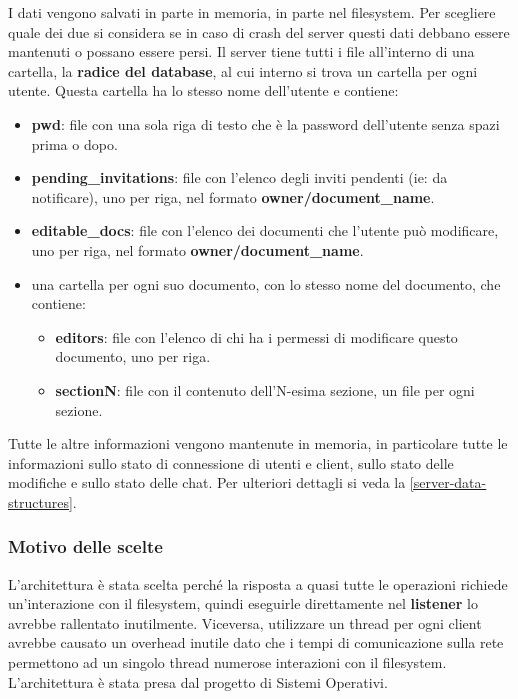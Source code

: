 \documentclass[a4paper]{article}
\theoremstyle{theorem}
\theoremstyle{remark}
\theoremstyle{definition}
\theoremstyle{corollary}
\theoremstyle{lemma}
\begin{document}
I dati vengono salvati in parte in memoria, in parte nel filesystem. Per scegliere quale dei due si considera se in caso di crash del server questi dati debbano essere mantenuti o possano essere persi. Il server tiene tutti i file all'interno di una cartella, la \textbf{radice del database}, al cui interno si trova un cartella per ogni utente. Questa cartella ha lo stesso nome dell'utente e contiene:
\begin{itemize}
	\item \textbf{pwd}: file con una sola riga di testo che è la password dell'utente senza spazi prima o dopo.
	\item \textbf{pending\_invitations}: file con l'elenco degli inviti pendenti (ie: da notificare), uno per riga, nel formato \textbf{owner/document\_name}.
	\item \textbf{editable\_docs}: file con l'elenco dei documenti che l'utente può modificare, uno per riga, nel formato \textbf{owner/document\_name}.
		\item una cartella per ogni suo documento, con lo stesso nome del documento, che contiene:
		\begin{itemize}
			\item \textbf{editors}: file con l'elenco di chi ha i permessi di modificare questo documento, uno per riga.
			\item \textbf{sectionN}: file con il contenuto dell'N-esima sezione, un file per ogni sezione.
		\end{itemize}
\end{itemize}

Tutte le altre informazioni vengono mantenute in memoria, in particolare tutte le informazioni sullo stato di connessione di utenti e client, sullo stato delle modifiche e sullo stato delle chat. Per ulteriori dettagli si veda la \autoref{server-data-structures}.

\subsubsection{Motivo delle scelte}
L'architettura è stata scelta perché la risposta a quasi tutte le operazioni richiede un'interazione con il filesystem, quindi eseguirle direttamente nel \textbf{listener} lo avrebbe rallentato inutilmente. Viceversa, utilizzare un thread per ogni client avrebbe causato un overhead inutile dato che i tempi di comunicazione sulla rete permettono ad un singolo thread numerose interazioni con il filesystem. L'architettura è stata presa dal progetto di Sistemi Operativi.
\end{document}
